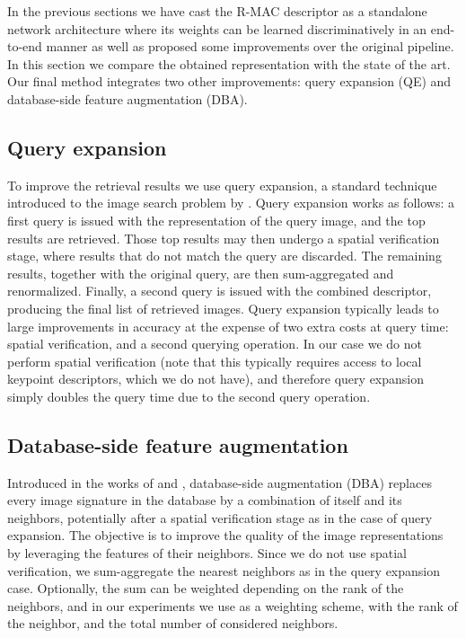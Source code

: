 \documentclass[twocolumn]{svjour3}          \smartqed  \usepackage{graphicx}
\begin{document}
In the previous sections we have cast the R-MAC descriptor as a standalone network architecture where its weights can be learned discriminatively in an end-to-end manner as well as proposed some improvements over the original pipeline.
In this section we compare the obtained representation with the state of the art. Our final method integrates two other improvements: query expansion (QE) and database-side feature augmentation (DBA).

\subsection{Query expansion}
\label{sub:qe}
To improve the retrieval results we use query expansion, a standard technique introduced to the image search problem by \cite{Chum2007}. Query expansion works as follows: a first query is issued with the representation of the query image, and the top  results are retrieved.
Those top  results may then undergo a spatial verification stage, where results that do not match the query are discarded.
The remaining results, together with the original query, are then sum-aggregated and renormalized.
Finally, a second query is issued with the combined descriptor, producing the final list of retrieved images.
Query expansion typically leads to large improvements in accuracy at the expense of two extra costs at query time: spatial verification, and a second querying operation.
In our case we do not perform spatial verification (note that this typically requires access to local keypoint descriptors, which we do not have), and therefore query expansion simply doubles the query time due to the second query operation.

\subsection{Database-side feature augmentation}
\label{sub:dba}
Introduced in the works of \cite{Turcot2009} and \cite{Arandjelovic2012three}, database-side augmentation (DBA) replaces every image signature in the database by a combination of itself and its neighbors, potentially after a spatial verification stage as in the case of query expansion. The objective is to improve the quality of the image representations by leveraging the features of their neighbors.
Since we do not use spatial verification, we sum-aggregate the nearest  neighbors as in the query expansion case.
Optionally, the sum can be weighted depending on the rank of the neighbors, and in our experiments we use  as a weighting scheme, with  the rank of the neighbor, and  the total number of considered neighbors.
\end{document}
